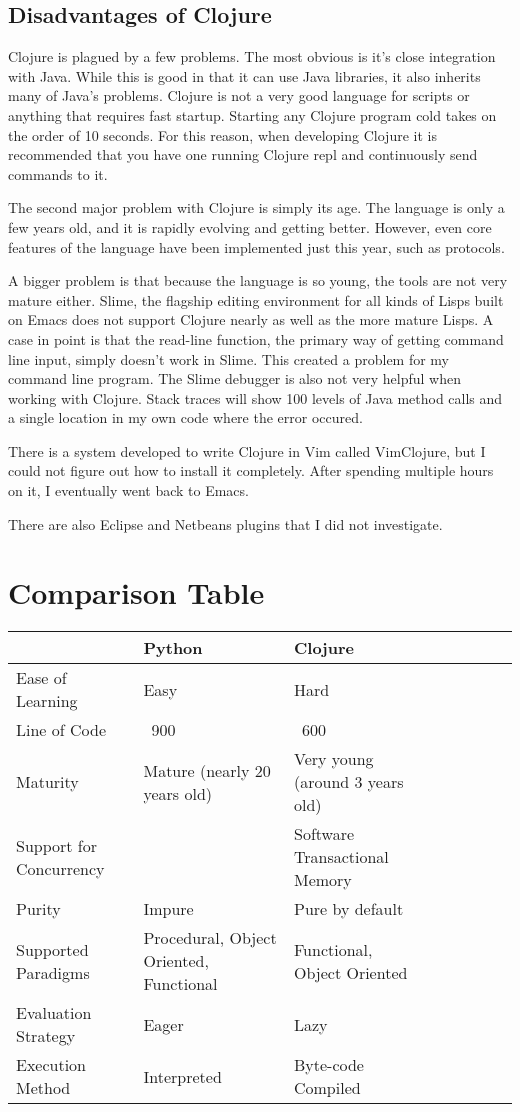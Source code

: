 \documentclass{article}
\begin{document}
\subsection{Disadvantages of Clojure}

Clojure is plagued by a few problems.  The most obvious is it's close integration with Java.  While this is good in that it can use Java libraries, it also inherits many of Java's problems.  Clojure is not a very good language for scripts or anything that requires fast startup.  Starting any Clojure program cold takes on the order of 10 seconds.  For this reason, when developing Clojure it is recommended that you have one running Clojure repl and continuously send commands to it.

The second major problem with Clojure is simply its age.  The language is only a few years old, and it is rapidly evolving and getting better.  However, even core features of the language have been implemented just this year, such as protocols.

A bigger problem is that because the language is so young, the tools are not very mature either.  Slime, the flagship editing environment for all kinds of Lisps built on Emacs does not support Clojure nearly as well as the more mature Lisps.  A case in point is that the read-line function, the primary way of getting command line input, simply doesn't work in Slime.  This created a problem for my command line program.  The Slime debugger is also not very helpful when working with Clojure.  Stack traces will show 100 levels of Java method calls and a single location in my own code where the error occured.

There is a system developed to write Clojure in Vim called VimClojure, but I could not figure out how to install it completely.  After spending multiple hours on it, I eventually went back to Emacs.

There are also Eclipse and Netbeans plugins that I did not investigate.

\section{Comparison Table}


\begin{tabular}{l*{6}{l}l}
                        & Python & Clojure \\
    \hline
    Ease of Learning    & Easy & Hard \\
    Line of Code        & ~900 & ~600 \\
    Maturity            & Mature (nearly 20 years old) & Very young (around 3 years old) \\
    Support for Concurrency &     & Software Transactional Memory \\
    Purity              & Impure & Pure by default \\
    Supported Paradigms & Procedural, Object Oriented, Functional & Functional, Object Oriented \\
    Evaluation Strategy & Eager & Lazy \\
    Execution Method    & Interpreted & Byte-code Compiled \\
\end{tabular}




\end{document}
